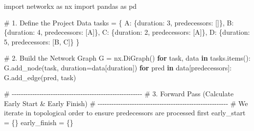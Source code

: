 \documentclass[
  letterpaper,
  DIV=11,
  numbers=noendperiod]{scrreprt}
\newenvironment{Shaded}{\begin{snugshade}}{\end{snugshade}}
\newcommand{\CommentTok}[1]{\textcolor[rgb]{0.37,0.37,0.37}{#1}}
\newcommand{\ControlFlowTok}[1]{\textcolor[rgb]{0.00,0.23,0.31}{\textbf{#1}}}
\newcommand{\DecValTok}[1]{\textcolor[rgb]{0.68,0.00,0.00}{#1}}
\newcommand{\ImportTok}[1]{\textcolor[rgb]{0.00,0.46,0.62}{#1}}
\newcommand{\KeywordTok}[1]{\textcolor[rgb]{0.00,0.23,0.31}{\textbf{#1}}}
\newcommand{\NormalTok}[1]{\textcolor[rgb]{0.00,0.23,0.31}{#1}}
\newcommand{\OperatorTok}[1]{\textcolor[rgb]{0.37,0.37,0.37}{#1}}
\newcommand{\StringTok}[1]{\textcolor[rgb]{0.13,0.47,0.30}{#1}}
\begin{document}
\begin{Shaded}
\begin{Highlighting}[]
\ImportTok{import}\NormalTok{ networkx }\ImportTok{as}\NormalTok{ nx}
\ImportTok{import}\NormalTok{ pandas }\ImportTok{as}\NormalTok{ pd}

\CommentTok{\# 1. Define the Project Data}
\NormalTok{tasks }\OperatorTok{=}\NormalTok{ \{}
    \StringTok{\textquotesingle{}A\textquotesingle{}}\NormalTok{: \{}\StringTok{\textquotesingle{}duration\textquotesingle{}}\NormalTok{: }\DecValTok{3}\NormalTok{, }\StringTok{\textquotesingle{}predecessors\textquotesingle{}}\NormalTok{: []\},}
    \StringTok{\textquotesingle{}B\textquotesingle{}}\NormalTok{: \{}\StringTok{\textquotesingle{}duration\textquotesingle{}}\NormalTok{: }\DecValTok{4}\NormalTok{, }\StringTok{\textquotesingle{}predecessors\textquotesingle{}}\NormalTok{: [}\StringTok{\textquotesingle{}A\textquotesingle{}}\NormalTok{]\},}
    \StringTok{\textquotesingle{}C\textquotesingle{}}\NormalTok{: \{}\StringTok{\textquotesingle{}duration\textquotesingle{}}\NormalTok{: }\DecValTok{2}\NormalTok{, }\StringTok{\textquotesingle{}predecessors\textquotesingle{}}\NormalTok{: [}\StringTok{\textquotesingle{}A\textquotesingle{}}\NormalTok{]\},}
    \StringTok{\textquotesingle{}D\textquotesingle{}}\NormalTok{: \{}\StringTok{\textquotesingle{}duration\textquotesingle{}}\NormalTok{: }\DecValTok{5}\NormalTok{, }\StringTok{\textquotesingle{}predecessors\textquotesingle{}}\NormalTok{: [}\StringTok{\textquotesingle{}B\textquotesingle{}}\NormalTok{, }\StringTok{\textquotesingle{}C\textquotesingle{}}\NormalTok{]\}}
\NormalTok{\}}

\CommentTok{\# 2. Build the Network Graph}
\NormalTok{G }\OperatorTok{=}\NormalTok{ nx.DiGraph()}
\ControlFlowTok{for}\NormalTok{ task, data }\KeywordTok{in}\NormalTok{ tasks.items():}
\NormalTok{    G.add\_node(task, duration}\OperatorTok{=}\NormalTok{data[}\StringTok{\textquotesingle{}duration\textquotesingle{}}\NormalTok{])}
    \ControlFlowTok{for}\NormalTok{ pred }\KeywordTok{in}\NormalTok{ data[}\StringTok{\textquotesingle{}predecessors\textquotesingle{}}\NormalTok{]:}
\NormalTok{        G.add\_edge(pred, task)}

\CommentTok{\# {-}{-}{-}{-}{-}{-}{-}{-}{-}{-}{-}{-}{-}{-}{-}{-}{-}{-}{-}{-}{-}{-}{-}{-}{-}{-}{-}{-}{-}{-}{-}{-}{-}{-}{-}{-}{-}{-}{-}{-}{-}{-}{-}{-}{-}{-}{-}{-}{-}{-}{-}{-}{-}{-}{-}{-}{-}}
\CommentTok{\# 3. Forward Pass (Calculate Early Start \& Early Finish)}
\CommentTok{\# {-}{-}{-}{-}{-}{-}{-}{-}{-}{-}{-}{-}{-}{-}{-}{-}{-}{-}{-}{-}{-}{-}{-}{-}{-}{-}{-}{-}{-}{-}{-}{-}{-}{-}{-}{-}{-}{-}{-}{-}{-}{-}{-}{-}{-}{-}{-}{-}{-}{-}{-}{-}{-}{-}{-}{-}{-}}
\CommentTok{\# We iterate in topological order to ensure predecessors are processed first}
\NormalTok{early\_start }\OperatorTok{=}\NormalTok{ \{\}}
\NormalTok{early\_finish }\OperatorTok{=}\NormalTok{ \{\}}


\end{Highlighting}
\end{Shaded}
\end{document}
